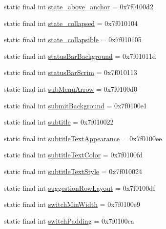 \begin{CompactItemize}
\item 
static final int \hyperlink{classandroid_1_1support_1_1transition_1_1_r_1_1attr_848e8b86a951e938e6367fdc801a44e8}{state\_\-above\_\-anchor} = 0x7f0100d2
\item 
static final int \hyperlink{classandroid_1_1support_1_1transition_1_1_r_1_1attr_fb09775db8ccd9af38a91e3f4bc74c30}{state\_\-collapsed} = 0x7f010104
\item 
static final int \hyperlink{classandroid_1_1support_1_1transition_1_1_r_1_1attr_1a37f9509756636ef5532374c230cce2}{state\_\-collapsible} = 0x7f010105
\item 
static final int \hyperlink{classandroid_1_1support_1_1transition_1_1_r_1_1attr_964ffa54cdae224de4abd6e1e111ef43}{statusBarBackground} = 0x7f01011d
\item 
static final int \hyperlink{classandroid_1_1support_1_1transition_1_1_r_1_1attr_9619e83e8b912dd7aa78cd54c3c018b9}{statusBarScrim} = 0x7f010113
\item 
static final int \hyperlink{classandroid_1_1support_1_1transition_1_1_r_1_1attr_e83799b5dad1ee40cb863535c99423b5}{subMenuArrow} = 0x7f0100d0
\item 
static final int \hyperlink{classandroid_1_1support_1_1transition_1_1_r_1_1attr_bbc46245ee60f62831a705edeed27f6d}{submitBackground} = 0x7f0100e1
\item 
static final int \hyperlink{classandroid_1_1support_1_1transition_1_1_r_1_1attr_0e09b55627bee2eac21ec2200af66654}{subtitle} = 0x7f010022
\item 
static final int \hyperlink{classandroid_1_1support_1_1transition_1_1_r_1_1attr_37e5683975ee0c8a69f591add68aba19}{subtitleTextAppearance} = 0x7f0100ee
\item 
static final int \hyperlink{classandroid_1_1support_1_1transition_1_1_r_1_1attr_3ca21ad1a8d67f8c682488e9acedc6a7}{subtitleTextColor} = 0x7f0100fd
\item 
static final int \hyperlink{classandroid_1_1support_1_1transition_1_1_r_1_1attr_1f3c772b2becf4e56ec7ad338133362d}{subtitleTextStyle} = 0x7f010024
\item 
static final int \hyperlink{classandroid_1_1support_1_1transition_1_1_r_1_1attr_820c4ccbfae46e5d37ee011cea869f48}{suggestionRowLayout} = 0x7f0100df
\item 
static final int \hyperlink{classandroid_1_1support_1_1transition_1_1_r_1_1attr_51fba62e319bc4e093cd2abe36b4ab1d}{switchMinWidth} = 0x7f0100e9
\item 
static final int \hyperlink{classandroid_1_1support_1_1transition_1_1_r_1_1attr_bc17670e148b87695c3367124b9ccac9}{switchPadding} = 0x7f0100ea

\end{CompactItemize}
